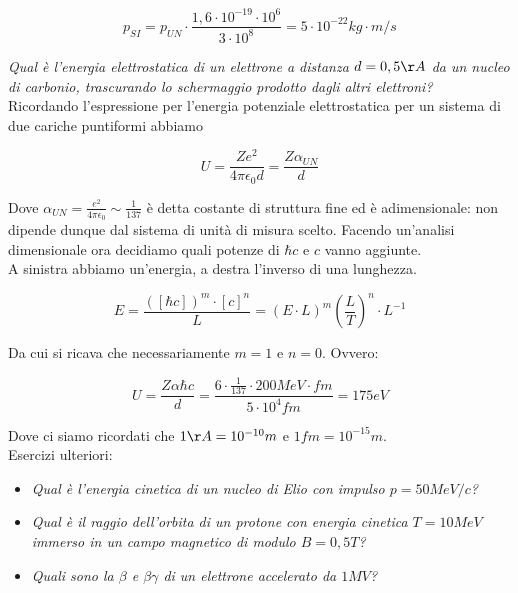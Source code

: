 \documentclass [a4paper, twoside] {book}
\begin{document}
\begin{equation}
p_{SI}=p_{UN}\cdot\frac{1,6\cdot10^{-19}\cdot10^6}{3\cdot10^8}=5\cdot10^{-22}kg\cdot m/s
\end{equation}

\emph{Qual è l'energia elettrostatica di un elettrone a distanza $d=0,5\AA$ da un nucleo di carbonio, trascurando lo schermaggio prodotto dagli altri elettroni?}\\

Ricordando l'espressione per l'energia potenziale elettrostatica per un sistema di due cariche puntiformi abbiamo

\begin{equation}
U=\frac{Ze^2}{4\pi\epsilon_0d}=\frac{Z\alpha_{UN}}{d}
\end{equation}

Dove $\alpha_{UN}=\frac{e^2}{4\pi\epsilon_0}\sim\frac{1}{137}$ è detta costante di struttura fine ed è adimensionale: non dipende dunque dal sistema di unità di misura scelto. Facendo un'analisi dimensionale ora decidiamo quali potenze di $\hbar c$ e $c$ vanno aggiunte.\\

A sinistra abbiamo un'energia, a destra l'inverso di una lunghezza.

\begin{equation}
E=\frac{([\hbar c])^m \cdot [c]^n}{L}=(E\cdot L)^m\left(\frac{L}{T}\right)^n\cdot L^{-1}
\end{equation}

Da cui si ricava che necessariamente $m=1$ e $n=0$. Ovvero:

\begin{equation}
U=\frac{Z\alpha\hbar c}{d}=\frac{6\cdot\frac{1}{137}\cdot200MeV\cdot fm}{5\cdot 10^4 fm}=175eV
\end{equation}

Dove ci siamo ricordati che $1\AA=10^{-10}m$ e $1 fm=10^{-15}m$.\\

Esercizi ulteriori:

\begin{itemize}
\item \emph{Qual è l'energia cinetica di un nucleo di Elio con impulso $p=50MeV/c$?}
\item \emph{Qual è il raggio dell'orbita di un protone con energia cinetica $T=10MeV$ immerso in un campo magnetico di modulo $B=0,5 T$?}
\item \emph{Quali sono la $\beta$ e $\beta\gamma$ di un elettrone accelerato da $1 MV$?}
\end{itemize}
\end{document}
